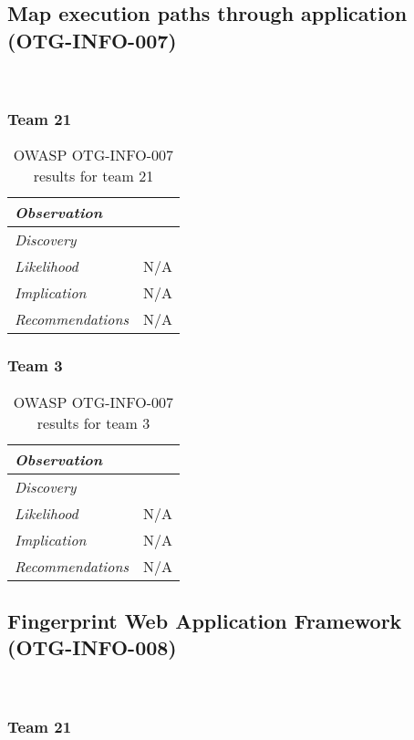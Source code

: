\documentclass[headsepline,footsepline,footinclude=false,oneside,fontsize=11pt,paper=a4,listof=totoc,bibliography=totoc]{scrbook} %
\begin{document}
\pagebreak 

\subsection{Map execution paths through application (OTG-INFO-007)}\

\subsubsection{Team 21}

\begin{table}[H]
\centering
 \begin{tabular}{l p{11cm}} 
 \textit{Observation} & \\ 
 \hline
 \textit{Discovery} &  \\
 \hline
 \textit{Likelihood} & N/A\\
 \hline
 \textit{Implication} & N/A\\
 \hline
 \textit{Recommendations} & N/A\\ 
\end{tabular}
\caption{OWASP OTG-INFO-007 results for team 21}
\label{table:scenario2}
\end{table}

\subsubsection{Team 3}

\begin{table}[H]
\centering
 \begin{tabular}{l p{11cm}} 
 \textit{Observation} & \\ 
 \hline
 \textit{Discovery} &  \\
 \hline
 \textit{Likelihood} & N/A\\
 \hline
 \textit{Implication} & N/A\\
 \hline
 \textit{Recommendations} & N/A\\ 
\end{tabular}
\caption{OWASP OTG-INFO-007 results for team 3}
\label{table:scenario2}
\end{table}

\pagebreak 

\subsection{Fingerprint Web Application Framework (OTG-INFO-008)}\

\subsubsection{Team 21}
\end{document}
